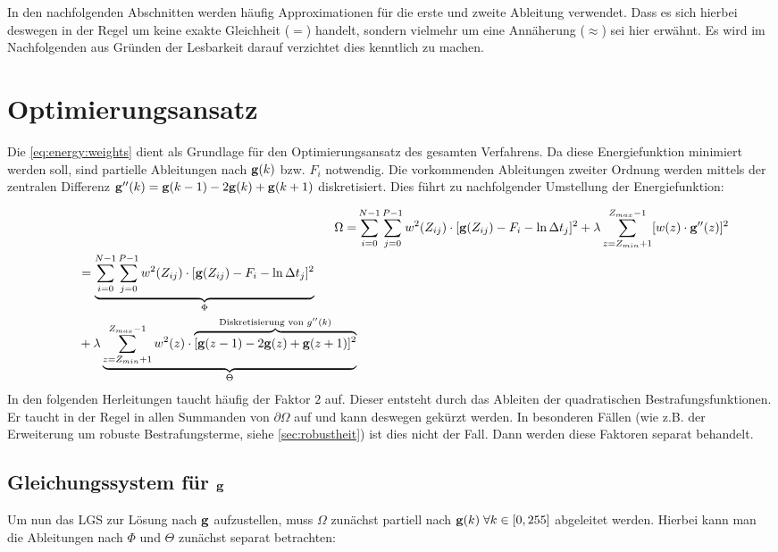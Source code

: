 In den nachfolgenden Abschnitten werden häufig Approximationen für die erste und zweite Ableitung verwendet. Dass es sich hierbei deswegen in der Regel um keine exakte Gleichheit ($=$) handelt, sondern vielmehr um eine Annäherung ($\approx$) sei hier erwähnt. Es wird im Nachfolgenden aus Gründen der Lesbarkeit darauf verzichtet dies kenntlich zu machen.


\section{Optimierungsansatz}
\label{sec:ansatz}
Die \autoref{eq:energy:weights} dient als Grundlage für den Optimierungsansatz des gesamten Verfahrens. Da diese Energiefunktion minimiert werden soll, sind partielle Ableitungen nach $\mathbf g(k)$ bzw. $F_i$ notwendig. Die vorkommenden Ableitungen zweiter Ordnung werden mittels der zentralen Differenz $\mathbf g''(k) = \mathbf g(k-1) - 2\mathbf g(k) +\mathbf g(k+1)$ diskretisiert. Dies führt zu nachfolgender Umstellung der Energiefunktion:

\begin{align}
\Omega =& \sum \limits_{i=0}^{N-1} \sum \limits_{j=0}^{P-1}w^2(Z_{ij})\cdot[\mathbf g(Z_{ij}) - F_i - \ln \Delta t_j]^2 + \lambda  \sum \limits_{z=Z_{min}+1}^{Z_{max}-1} [w(z) \cdot \mathbf g''(z)]^2\\
\label{eq:energy:diskret}
\begin{split}
 &\qquad= \underbrace{\sum \limits_{i=0}^{N-1} \sum \limits_{j=0}^{P-1}w^2(Z_{ij})\cdot[\mathbf g(Z_{ij}) - F_i - \ln \Delta t_j]^2}_{\Phi} \\
 &\qquad+ \lambda \underbrace{ \sum \limits_{z=Z_{min}+1}^{Z_{max}-1} w^2(z) \cdot \overbrace{
 	[\mathbf g(z-1)-2\mathbf g(z)+\mathbf g(z+1)]^2
 }^{
 	\text{Diskretisierung von }g''(k)
 }
 }_{\Theta}
 \end{split}	
 \end{align}
In den folgenden Herleitungen taucht häufig der Faktor $2$ auf. Dieser entsteht durch das Ableiten der quadratischen Bestrafungsfunktionen. Er taucht in der Regel in allen Summanden von $\partial \Omega$ auf und kann deswegen gekürzt werden. In besonderen Fällen (wie z.B. der Erweiterung um robuste Bestrafungsterme, siehe \autoref{sec:robustheit}) ist dies nicht der Fall. Dann werden diese Faktoren separat behandelt.

\subsection{Gleichungssystem für $\mathbf g$}
Um nun das \gls{LGS} zur Lösung nach $\mathbf g$ aufzustellen, muss $\Omega$ zunächst partiell nach $\mathbf g(k) \; \forall k \in [0,255]$ abgeleitet werden. Hierbei kann man die Ableitungen nach $\Phi$ und $\Theta$ zunächst separat betrachten:

